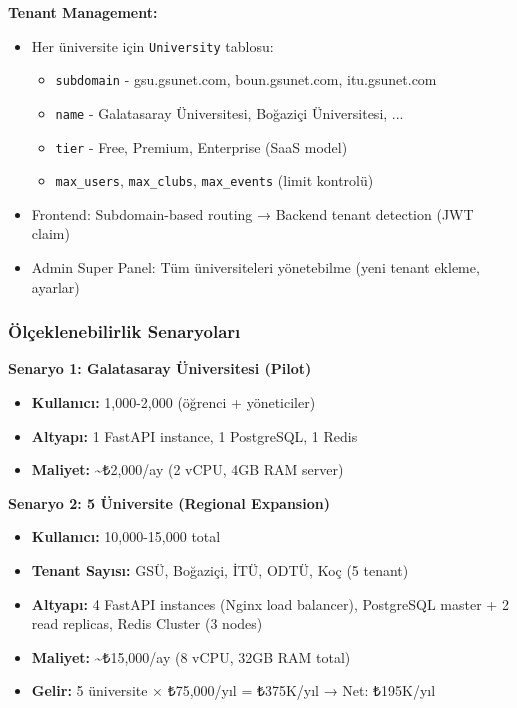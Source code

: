 \documentclass[a4paper,12pt]{report}
\begin{document}
\textbf{Tenant Management:}

\begin{itemize}
    \item Her üniversite için \texttt{University} tablosu:
    \begin{itemize}
        \item \texttt{subdomain} - gsu.gsunet.com, boun.gsunet.com, itu.gsunet.com
        \item \texttt{name} - Galatasaray Üniversitesi, Boğaziçi Üniversitesi, ...
        \item \texttt{tier} - Free, Premium, Enterprise (SaaS model)
        \item \texttt{max\_users}, \texttt{max\_clubs}, \texttt{max\_events} (limit kontrolü)
    \end{itemize}
    \item Frontend: Subdomain-based routing → Backend tenant detection (JWT claim)
    \item Admin Super Panel: Tüm üniversiteleri yönetebilme (yeni tenant ekleme, ayarlar)
\end{itemize}

\subsubsection{Ölçeklenebilirlik Senaryoları}

\textbf{Senaryo 1: Galatasaray Üniversitesi (Pilot)}
\begin{itemize}
    \item \textbf{Kullanıcı:} 1,000-2,000 (öğrenci + yöneticiler)
    \item \textbf{Altyapı:} 1 FastAPI instance, 1 PostgreSQL, 1 Redis
    \item \textbf{Maliyet:} \textasciitilde{}₺2,000/ay (2 vCPU, 4GB RAM server)
\end{itemize}

\textbf{Senaryo 2: 5 Üniversite (Regional Expansion)}
\begin{itemize}
    \item \textbf{Kullanıcı:} 10,000-15,000 total
    \item \textbf{Tenant Sayısı:} GSÜ, Boğaziçi, İTÜ, ODTÜ, Koç (5 tenant)
    \item \textbf{Altyapı:} 4 FastAPI instances (Nginx load balancer), PostgreSQL master + 2 read replicas, Redis Cluster (3 nodes)
    \item \textbf{Maliyet:} \textasciitilde{}₺15,000/ay (8 vCPU, 32GB RAM total)
    \item \textbf{Gelir:} 5 üniversite × ₺75,000/yıl = ₺375K/yıl → Net: ₺195K/yıl
\end{itemize}
\end{document}

